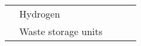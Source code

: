 {\begin{tabular}{@{}lp{5cm}p{2cm}p{2cm}p{12cm}@{}}
                                                      & Hydrogen                                               &                                                                                        &                                                   &                                                                                                                                                                                                                                                                                                                                                                                                                                                                                                                                                                                                                                                                                                                                                                                                                                                                                                                    \\ \cmidrule(l){2-2}
                                                      & \multirow[t]{2}{=}{Waste storage units}                   &                                                                                        &                                                   &                                                                                                                                                                                                                                                                                                                                                                                                                                                                                                                                                                                                                                                                                                                                                                                                                                                                                                                    \\ \midrule

\end{tabular}}

